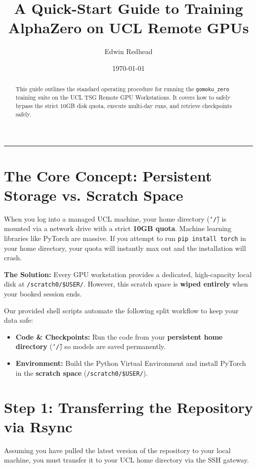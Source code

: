 \documentclass[11pt, a4paper]{article}
\title{\textbf{A Quick-Start Guide to Training AlphaZero on UCL Remote GPUs}}
\author{Edwin Redhead}
\date{\today}
\begin{document}
\maketitle

\begin{abstract}
This guide outlines the standard operating procedure for running the \texttt{gomoku\_zero} training suite on the UCL TSG Remote GPU Workstations. It covers how to safely bypass the strict 10GB disk quota, execute multi-day runs, and retrieve checkpoints safely.
\end{abstract}

\tableofcontents
\vspace{1em}
\hrule
\vspace{2em}

\section{The Core Concept: Persistent Storage vs. Scratch Space}

When you log into a managed UCL machine, your home directory (\texttt{\char`\~/}) is mounted via a network drive with a strict \textbf{10GB quota}. Machine learning libraries like PyTorch are massive. If you attempt to run \texttt{pip install torch} in your home directory, your quota will instantly max out and the installation will crash.

\textbf{The Solution:} Every GPU workstation provides a dedicated, high-capacity local disk at \texttt{/scratch0/\$USER/}. However, this scratch space is \textbf{wiped entirely} when your booked session ends. 

Our provided shell scripts automate the following split workflow to keep your data safe:
\begin{itemize}
    \item \textbf{Code \& Checkpoints:} Run the code from your \textbf{persistent home directory} (\texttt{\char`\~/}) so models are saved permanently.
    \item \textbf{Environment:} Build the Python Virtual Environment and install PyTorch in the \textbf{scratch space} (\texttt{/scratch0/\$USER/}).
\end{itemize}

\section{Step 1: Transferring the Repository via Rsync}

Assuming you have pulled the latest version of the repository to your local machine, you must transfer it to your UCL home directory via the SSH gateway. 
\end{document}
